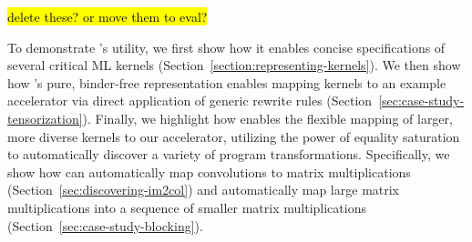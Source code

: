 %  
%  
%


\hl{delete these? or move them to eval?}

To demonstrate \g's utility,
  we first show how it enables
  concise specifications of several
  critical ML kernels
  (Section~\ref{section:representing-kernels}).
We then show how
  \g's pure, binder-free
  representation enables mapping kernels
  to an example accelerator via
  direct application of generic rewrite rules
  (Section~\ref{sec:case-study-tensorization}).
Finally,
  we highlight how \g
  enables the
  flexible mapping of
  larger, more diverse kernels
  to our accelerator,
  utilizing the power
  of equality saturation
  to automatically discover
  a variety of program transformations.
Specifically,
  we show how \g can automatically
  map convolutions to matrix multiplications
  (Section~\ref{sec:discovering-im2col})
  and automatically
  map large matrix multiplications into a
  sequence of smaller matrix multiplications
  (Section~\ref{sec:case-study-blocking}).
  
